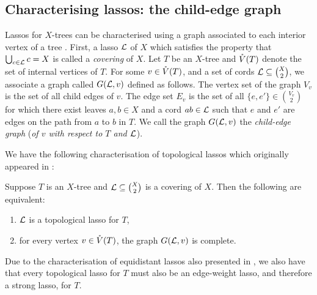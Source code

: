 \subsection{Characterising lassos: the child-edge graph}
\label{sec:lassoing-rooted-x}

Lassos for $X$-trees can be characterised using a graph associated to each
interior vertex of a tree \cite{huber13lassoing}.  First, a lasso ${\mathcal L}$ of $X$
which satisfies the property that $\bigcup_{c \in {\mathcal L}} c = X$ is called a
\textit{covering} of $X$.  Let $T$ be an $X$-tree and $\mathring{V}(T)$ denote the set
of internal vertices of $T$.  For some $v \in \mathring{V}(T)$, and a set of cords ${\mathcal L}
\subseteq {X \choose 2}$, we associate a graph called $G({\mathcal L},v)$ defined as
follows.  The vertex set of the graph $V_v$ is the set of all child edges of
$v$.  The edge set $E_v$ is the set of all $\{e,e'\} \in {V_v \choose 2}$ for
which there exist leaves $a,b \in X$ and a cord $ab \in {\mathcal L}$ such that $e$ and
$e'$ are edges on the path from $a$ to $b$ in $T$.  We call the graph
$G({\mathcal L},v)$ the \textit{child-edge graph} (\textit{of $v$ with respect to $T$
  and ${\mathcal L}$}).

We have the following characterisation of topological lassos which originally
appeared in \cite{huber13lassoing}:
\begin{lem}
  \label{lem:child-edge-graph-complete}
  Suppose $T$ is an $X$-tree and ${\mathcal L} \subseteq {X \choose 2}$ is a covering
  of $X$.  Then the following are equivalent:
  \begin{enumerate}
  \item ${\mathcal L}$ is a topological lasso for $T$,
  \item for every vertex $v \in \mathring{V}(T)$, the graph $G({\mathcal L},v)$ is complete.
  \end{enumerate}
\end{lem}

Due to the characterisation of equidistant lassos also presented in
\cite{huber13lassoing}, we also have that every topological lasso for $T$ must also be an
edge-weight lasso, and therefore a strong lasso, for $T$.

